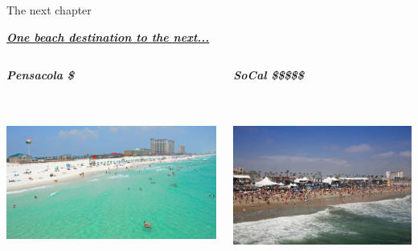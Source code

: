 \documentclass[serif]{beamer}\usepackage[]{graphicx}\usepackage[]{color}
\newcommand{\emtxt}[1]{\textbf{\textit{#1}}}
\begin{document}
\begin{frame}{The next chapter}{}
{\Large \centerline{\underline{\emtxt{One beach destination to the next...}}}}
\vspace{0.2in}
\begin{columns}[t]
\begin{column}{0.5\textwidth}
\centerline{\emtxt{Pensacola \$}} \\~\\
\includegraphics[trim= 0cm 0cm 1cm 0cm, clip=true,width = \textwidth]{fig/pbeach.jpg}
\end{column}
\begin{column}{0.5\textwidth}
\centerline{\emtxt{SoCal \$\$\$\$\$}} \\~\\
\includegraphics[trim= 1cm 0cm 0cm 2.44cm, clip=true,width = \textwidth]{fig/hbeach.jpg}
\end{column}
\end{columns}
\end{frame}
\end{document}
